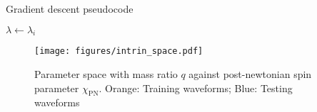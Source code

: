 \documentclass[twocolumn]{aastex631}
\begin{document}
\begin{algorithm}[t]
	\caption{Gradient descent pseudocode}
	\label{alg:gradient}
	    $\lambda\leftarrow\lambda_i$\\
	 \Return{$\lambda$}
\end{algorithm}

\begin{figure}[t]
	\centering
	\texttt{[image: figures/intrin\_space.pdf]}
	\caption{Parameter space with mass ratio $q$ against post-newtonian spin parameter $\chi_{\mathrm{PN}}$. Orange: Training waveforms; Blue: Testing waveforms}
	\label{fig:intrin_space}
\end{figure}
\end{document}
